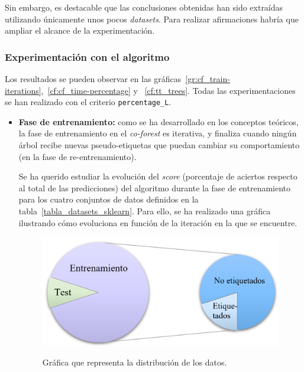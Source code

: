 Sin embargo, es destacable que las conclusiones obtenidas han sido extraídas utilizando únicamente unos pocos \textit{datasets}. Para realizar afirmaciones habría que ampliar el alcance de la experimentación.



\subsubsection{Experimentación con el algoritmo}

Los resultados se pueden observar en las gráficas~\ref{gr:cf_train-iterations},~\ref{cf:cf_time-percentage} y ~\ref{cf:tt_trees}. Todas las experimentaciones se han realizado con el criterio \texttt{percentage\_L}.


\begin{itemize}
	\item \textbf{Fase de entrenamiento:} como se ha desarrollado en los conceptos teóricos, la fase de entrenamiento en el \textit{co-forest} es iterativa, y finaliza cuando ningún árbol recibe nuevas pseudo-etiquetas que puedan cambiar su comportamiento (en la fase de re-entrenamiento).
	
	Se ha querido estudiar la evolución del \textit{score} (porcentaje de aciertos respecto al total de las predicciones) del algoritmo durante la fase de entrenamiento para los cuatro conjuntos de datos definidos en la tabla~\ref{tabla_datasets_sklearn}. Para ello, se ha realizado una gráfica ilustrando cómo evoluciona en función de la iteración en la que se encuentre.
	
	\begin{figure}[h]
		\caption[\textit{Co-Forest}: distribución de datos entrenamiento y \textit{test}]{Gráfica que representa la distribución de los datos.}
		\centering
		\includegraphics[scale=0.3]{../img/memoria/5_entrenamiento_particiones}
		\label{5_entrenamiento_particiones}
	\end{figure}


\end{itemize}
